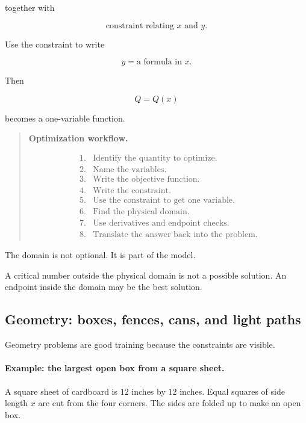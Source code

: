 together with

\[
\text{constraint relating }x\text{ and }y.
\]

Use the constraint to write

\[
y=\text{a formula in }x.
\]

Then

\[
Q=Q(x)
\]

becomes a one-variable function.

\begin{quote}
\textbf{Optimization workflow.}

\[
\begin{array}{ll}
\text{1.} & \text{Identify the quantity to optimize.}\\
\text{2.} & \text{Name the variables.}\\
\text{3.} & \text{Write the objective function.}\\
\text{4.} & \text{Write the constraint.}\\
\text{5.} & \text{Use the constraint to get one variable.}\\
\text{6.} & \text{Find the physical domain.}\\
\text{7.} & \text{Use derivatives and endpoint checks.}\\
\text{8.} & \text{Translate the answer back into the problem.}
\end{array}
\]
\end{quote}

The domain is not optional.  It is part of the model.

A critical number outside the physical domain is not a possible solution.  An endpoint
inside the domain may be the best solution.

\subsection{Geometry: boxes, fences, cans, and light paths}
\label{subsec:geometry-optimization}

Geometry problems are good training because the constraints are visible.

\paragraph{Example: the largest open box from a square sheet.}
A square sheet of cardboard is \(12\) inches by \(12\) inches.  Equal squares of side
length \(x\) are cut from the four corners.  The sides are folded up to make an open box.

